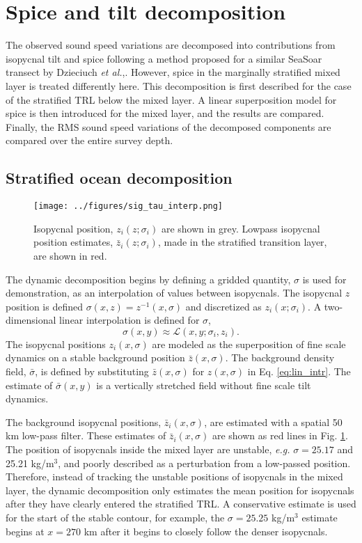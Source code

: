 \documentclass[preprint,NumberedRefs]{JASA}
\begin{document}
\section{\label{sec:decomposition}Spice and tilt decomposition}
The observed sound speed variations are decomposed into contributions from isopycnal tilt and spice following a method proposed for a similar SeaSoar transect by Dzieciuch \emph{et al.},\citep{dzieciuch2004}. However, spice in the marginally stratified mixed layer is treated differently here. This decomposition is first described for the case of the stratified TRL below the mixed layer. A linear superposition model for spice is then introduced for the mixed layer, and the results are compared. Finally, the RMS sound speed variations of the decomposed components are compared over the entire survey depth.

\subsection{Stratified ocean decomposition}
\begin{figure}
\texttt{[image: ../figures/sig\_tau\_interp.png]}
    \caption{\label{fig:cntrs}{Isopycnal position, $z_i(z; \sigma_i)$ are shown in grey. Lowpass isopycnal position estimates, $\bar{z}_i(z; \sigma_i)$, made in the stratified transition layer, are shown in red.}}
\end{figure}

The dynamic decomposition begins by defining a gridded quantity, $\sigma$ is used for demonstration, as an interpolation of values between isopycnals. The isopycnal $z$ position is defined $\sigma(x, z) = z^{-1}(x, \sigma)$ and discretized as $z_i(x; \sigma_i)$. A two-dimensional linear interpolation is defined for $\sigma$,
\begin{equation}
    \sigma(x,y)\approx\mathcal{L}(x, y; \sigma_i, z_i).
    \label{eq:lin_intr}
\end{equation}
The isopycnal positions $z_i(x, \sigma)$ are modeled as the superposition of fine scale dynamics on a stable background position $\bar{z}(x, \sigma)$. The background density field, $\bar{\sigma}$, is defined by substituting $\bar{z}(x, \sigma)$ for $z(x, \sigma)$ in Eq. \eqref{eq:lin_intr}. The estimate of $\bar{\sigma}(x,y)$ is a vertically stretched field without fine scale tilt dynamics.

The background isopycnal positions, $\bar{z}_i(x, \sigma)$, are estimated with a spatial 50 km low-pass filter. These estimates of $\bar{z}_i(x, \sigma)$ are shown as red lines in Fig. \ref{fig:cntrs}. The position of isopycnals inside the mixed layer are unstable, \emph{e.g.} $\sigma=25.17$ and 25.21 kg/m$^3$, and poorly described as a perturbation from a low-passed position. Therefore, instead of tracking the unstable positions of isopycnals in the mixed layer, the dynamic decomposition only estimates the mean position for isopycnals after they have clearly entered the stratified TRL. A conservative estimate is used for the start of the stable contour, for example, the $\sigma=25.25$ kg/m$^3$ estimate begins at $x=270$ km after it begins to closely follow the denser isopycnals.
\end{document}
